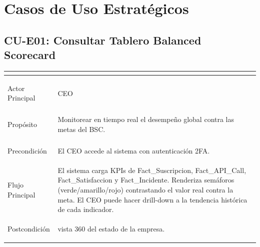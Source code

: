 ﻿\documentclass[11pt, letterpaper]{article}
\begin{document}





\appendix

\newpage





\section{Casos de Uso Estratégicos}



\subsection{CU-E01: Consultar Tablero Balanced Scorecard}



\begin{table}[H]

\footnotesize

\begin{tabularx}{\linewidth}{>{\bfseries\raggedright\arraybackslash}p{2.5cm} >{\raggedright\arraybackslash}X}

\toprule

\multicolumn{2}{l}{\textbf{CU-E01: Consultar Tablero Balanced Scorecard} \hfill \textit{Prioridad: 10 \quad | \quad Estratégico}} \\

\midrule

Actor Principal & CEO \\

\midrule

Propósito & Monitorear en tiempo real el desempeño global contra las metas del BSC. \\

\midrule

Precondición & El CEO accede al sistema con autenticación 2FA. \\

\midrule

Flujo Principal & El sistema carga KPIs de Fact\_Suscripcion, Fact\_API\_Call, Fact\_Satisfaccion y Fact\_Incidente. Renderiza semáforos (verde/amarillo/rojo) contrastando el valor real contra la meta. El CEO puede hacer drill-down a la tendencia histórica de cada indicador. \\

\midrule

Postcondición & vista 360 del estado de la empresa. \\

\bottomrule

\end{tabularx}

\end{table}
\end{document}
